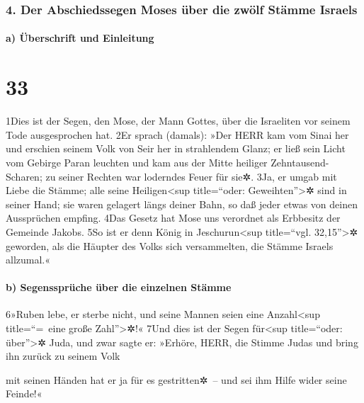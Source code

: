 \hypertarget{der-abschiedssegen-moses-uxfcber-die-zwuxf6lf-stuxe4mme-israels}{%
\subsubsection{4. Der Abschiedssegen Moses über die zwölf Stämme
Israels}\label{der-abschiedssegen-moses-uxfcber-die-zwuxf6lf-stuxe4mme-israels}}

\hypertarget{a-uxfcberschrift-und-einleitung}{%
\paragraph{a) Überschrift und
Einleitung}\label{a-uxfcberschrift-und-einleitung}}

\hypertarget{section-32}{%
\section{33}\label{section-32}}

1Dies ist der Segen, den Mose, der Mann Gottes, über die Israeliten vor
seinem Tode ausgesprochen hat. 2Er sprach (damals): »Der HERR kam vom
Sinai her und erschien seinem Volk von Seir her in strahlendem Glanz; er
ließ sein Licht vom Gebirge Paran leuchten und kam aus der Mitte
heiliger Zehntausend-Scharen; zu seiner Rechten war loderndes Feuer für
sie✲. 3Ja, er umgab mit Liebe die Stämme; alle seine
Heiligen\textless sup title=``oder: Geweihten''\textgreater✲ sind in
seiner Hand; sie waren gelagert längs deiner Bahn, so daß jeder etwas
von deinen Aussprüchen empfing. 4Das Gesetz hat Mose uns verordnet als
Erbbesitz der Gemeinde Jakobs. 5So ist er denn König in
Jeschurun\textless sup title=``vgl. 32,15''\textgreater✲ geworden, als
die Häupter des Volks sich versammelten, die Stämme Israels allzumal.«

\hypertarget{b-segensspruxfcche-uxfcber-die-einzelnen-stuxe4mme}{%
\paragraph{b) Segenssprüche über die einzelnen
Stämme}\label{b-segensspruxfcche-uxfcber-die-einzelnen-stuxe4mme}}

6»Ruben lebe, er sterbe nicht, und seine Mannen seien eine
Anzahl\textless sup title=``=~eine große Zahl''\textgreater✲!« 7Und dies
ist der Segen für\textless sup title=``oder: über''\textgreater✲ Juda,
und zwar sagte er: »Erhöre, HERR, die Stimme Judas und bring ihn zurück
zu seinem Volk

mit seinen Händen hat er ja für es gestritten✲~-- und sei ihm Hilfe
wider seine Feinde!«

